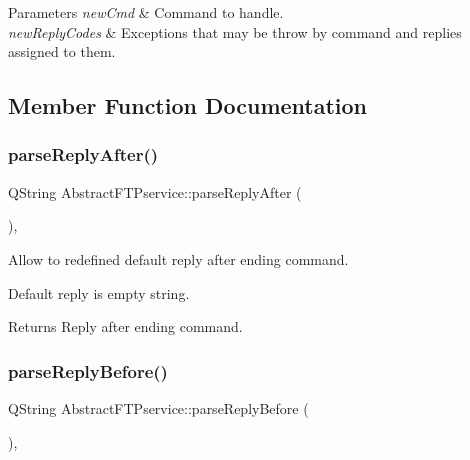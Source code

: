 \begin{DoxyParams}{Parameters}
{\em new\+Cmd} & Command to handle. \\
\hline
{\em new\+Reply\+Codes} & Exceptions that may be throw by command and replies assigned to them. \\
\hline
\end{DoxyParams}


\subsection{Member Function Documentation}
\mbox{\label{classAbstractFTPservice_a914cd7810f9e8e563dd0dd7bb34d4224}} 
\subsubsection{\texorpdfstring{parse\+Reply\+After()}{parseReplyAfter()}}
{\footnotesize\ttfamily Q\+String Abstract\+F\+T\+Pservice\+::parse\+Reply\+After (\begin{DoxyParamCaption}\item[{\hyperlink{classAbstractFTPcommand}{Abstract\+F\+T\+Pcommand} $\ast$ const}]{ }\end{DoxyParamCaption})\hspace{0.3cm}{\ttfamily [protected]}, {\ttfamily [virtual]}}



Allow to redefined default reply after ending command. 

Default reply is empty string. \begin{DoxyReturn}{Returns}
Reply after ending command. 
\end{DoxyReturn}
\mbox{\label{classAbstractFTPservice_a3ac6c2518376864615d68199845d910a}} 
\subsubsection{\texorpdfstring{parse\+Reply\+Before()}{parseReplyBefore()}}
{\footnotesize\ttfamily Q\+String Abstract\+F\+T\+Pservice\+::parse\+Reply\+Before (\begin{DoxyParamCaption}\item[{\hyperlink{classAbstractFTPcommand}{Abstract\+F\+T\+Pcommand} $\ast$ const}]{ }\end{DoxyParamCaption})\hspace{0.3cm}{\ttfamily [protected]}, {\ttfamily [virtual]}}



